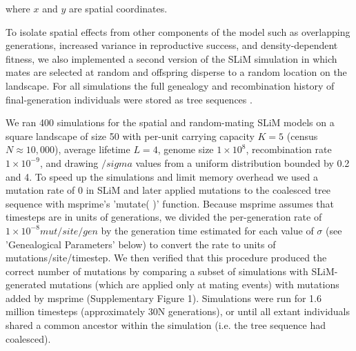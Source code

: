 \documentclass[9pt,twocolumn,twoside,lineno]{gsajnl}
\begin{document}
where $x$ and $y$ are spatial coordinates. 

To isolate spatial effects from other components of the model such as overlapping generations, increased variance in reproductive success, and density-dependent fitness, we  also implemented a second version of the SLiM simulation in which mates are selected at random and offspring disperse to a random location on the landscape. For all simulations the full genealogy and recombination history of final-generation individuals were stored as tree sequences \citep{Kelleher2018}. 


We ran 400 simulations for the spatial and random-mating SLiM models on a square landscape of size 50 with per-unit carrying capacity $K=5$ (census $N \approx 10,000$), average lifetime $L=4$, genome size $1\times10^{8}$, recombination rate $1\times10^{-9}$, and drawing $/sigma$ values from a uniform distribution bounded by 0.2 and 4. To speed up the simulations and limit memory overhead we used a mutation rate of 0 in SLiM and later applied mutations to the coalesced tree sequence with msprime's 'mutate( )' function. Because msprime assumes that timesteps are in units of generations, we divided the per-generation rate of $1\times10^{-8} mut/site/gen$ by the generation time estimated for each value of $\sigma$ (see 'Genealogical Parameters' below) to convert the rate to units of mutations/site/timestep. We then verified that this procedure produced the correct number of mutations by comparing a subset of simulations with SLiM-generated mutations (which are applied only at mating events) with mutations added by msprime (Supplementary Figure 1). Simulations were run for 1.6 million timesteps (approximately 30N generations), or until all extant individuals shared a common ancestor within the simulation (i.e. the tree sequence had coalesced). 

\end{document}
